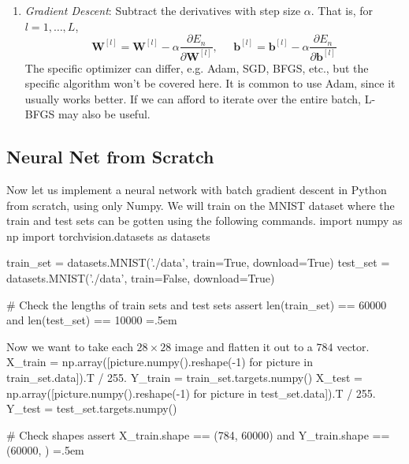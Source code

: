 \documentclass{article}
\newenvironment{cverbatim}
 {\SaveVerbatim{cverb}}
 {\endSaveVerbatim
  \flushleft\fboxrule=0pt\fboxsep=.5em
  \colorbox{cverbbg}{%
    \makebox[\dimexpr\linewidth-2\fboxsep][l]{\BUseVerbatim{cverb}}%
  }
  \endflushleft
}
\theoremstyle{definition}
\theoremstyle{remark}
\theoremstyle{definition}
\begin{document}
\begin{enumerate}
    \item \textit{Gradient Descent}: Subtract the derivatives with step size $\alpha$. That is, for $l = 1, \ldots, L$, 
    \[\mathbf{W}^{[l]} = \mathbf{W}^{[l]} - \alpha \frac{\partial E_n}{\partial \mathbf{W}^{[l]}} , \;\;\;\;\; \mathbf{b}^{[l]} = \mathbf{b}^{[l]} - \alpha \frac{\partial E_n}{\partial \mathbf{b}^{[l]}}\]
    The specific optimizer can differ, e.g. Adam, SGD, BFGS, etc., but the specific algorithm won't be covered here. It is common to use Adam, since it usually works better. If we can afford to iterate over the entire batch, L-BFGS may also be useful. 
\end{enumerate}


\subsection{Neural Net from Scratch}

Now let us implement a neural network with batch gradient descent in Python from scratch, using only Numpy. We will train on the MNIST dataset where the train and test sets can be gotten using the following commands. 
\begin{cverbatim}
import numpy as np 
import torchvision.datasets as datasets

train_set = datasets.MNIST('./data', train=True, download=True)
test_set = datasets.MNIST('./data', train=False, download=True)

# Check the lengths of train sets and test sets
assert len(train_set) == 60000 and len(test_set) == 10000
\end{cverbatim}

Now we want to take each $28 \times 28$ image and flatten it out to a $784$ vector. 
\begin{cverbatim}
X_train = np.array([picture.numpy().reshape(-1) for picture in train_set.data]).T / 255.
Y_train = train_set.targets.numpy() 
X_test = np.array([picture.numpy().reshape(-1) for picture in test_set.data]).T / 255.
Y_test = test_set.targets.numpy()

# Check shapes 
assert X_train.shape == (784, 60000) and Y_train.shape == (60000, )
\end{cverbatim}
\end{document}
